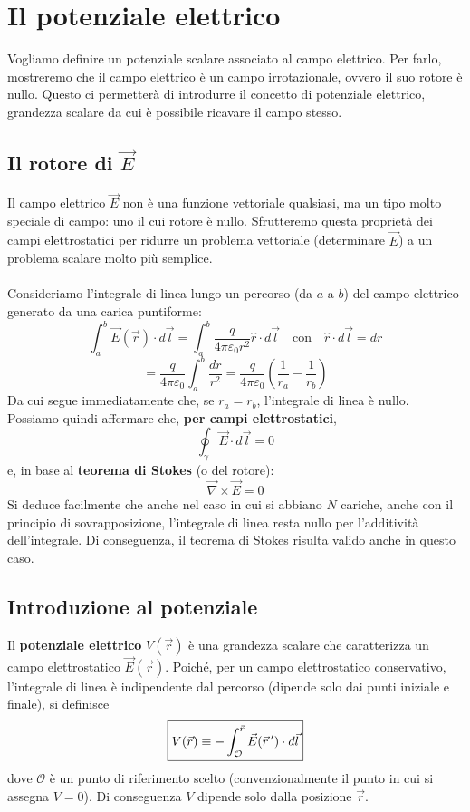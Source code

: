\documentclass{book}
\begin{document}
\begin{itemize}
\end{itemize}

\chapter{Il potenziale elettrico}
Vogliamo definire un potenziale scalare associato al campo elettrico.  
Per farlo, mostreremo che il campo elettrico è un campo irrotazionale, ovvero il suo rotore è nullo.  
Questo ci permetterà di introdurre il concetto di potenziale elettrico, grandezza scalare da cui è possibile ricavare il campo stesso.
\section{Il rotore di \texorpdfstring{$\vec{E}$}{E}}
Il campo elettrico $\vec{E}$ non è una funzione vettoriale qualsiasi, ma un tipo molto speciale di campo: uno il cui rotore è nullo.  
Sfrutteremo questa proprietà dei campi elettrostatici per ridurre un problema vettoriale (determinare $\vec{E}$) a un problema scalare molto più semplice.
\\
\\
Consideriamo l’integrale di linea lungo un percorso (da $a$ a $b$) del campo elettrico generato da una carica puntiforme:
\[
\int_a^b \vec{E}(\vec{r}) \cdot d\vec{l} 
= \int_a^b \frac{q}{4\pi \varepsilon_0 r^2} \hat{r} \cdot d\vec{l} 
\quad \text{con} \quad \hat{r} \cdot d\vec{l} = dr
\]
\[
= \frac{q}{4\pi \varepsilon_0} \int_a^b \frac{dr}{r^2} 
= \frac{q}{4\pi \varepsilon_0} \left( \frac{1}{r_a} - \frac{1}{r_b} \right)
\]
Da cui segue immediatamente che, se $r_a = r_b$, l’integrale di linea è nullo.  
Possiamo quindi affermare che, \textbf{per campi elettrostatici},
\[
\oint_{\gamma} \vec{E} \cdot d\vec{l} = 0
\]
e, in base al \textbf{teorema di Stokes} (o del rotore):
\[
\boxed{
\vec{\nabla} \times \vec{E} = 0
}
\]
Si deduce facilmente che anche nel caso in cui si abbiano $N$ cariche, anche con il principio di sovrapposizione, l’integrale di linea resta nullo per l’additività dell’integrale.  
Di conseguenza, il teorema di Stokes risulta valido anche in questo caso.

\section{Introduzione al potenziale}

Il \textbf{potenziale elettrico} \(V(\vec r)\) è una grandezza scalare che caratterizza un campo elettrostatico \(\vec{E}(\vec r)\).
Poiché, per un campo elettrostatico conservativo, l'integrale di linea è indipendente dal percorso (dipende solo dai punti iniziale e finale), si definisce
\[
\boxed{%
V(\vec{r}) \equiv - \int_{\mathcal{O}}^{\vec{r}} \vec{E}(\vec{r}\,') \cdot d\vec{l}
}
\]
dove \(\mathcal{O}\) è un punto di riferimento scelto (convenzionalmente il punto in cui si assegna \(V=0\)). Di conseguenza \(V\) dipende solo dalla posizione \(\vec r\).
\end{document}
